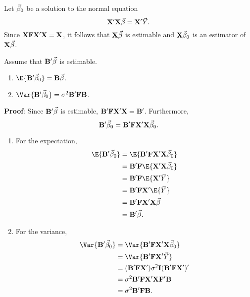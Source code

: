 \begin{Theorem}{}{}
    Let $ \vec{\beta}_0 $ be a solution to the normal equation
    \[ \mathbf{X}'\mathbf{X}\vec{\beta}=\mathbf{X}'\vec{Y}. \]
    Since $ \mathbf{X}\mathbf{F}\mathbf{X}'\mathbf{X}=\mathbf{X} $,
    it follows that $ \mathbf{X}\vec{\beta} $ is estimable and
    $ \mathbf{X}\vec{\beta}_0 $ is an estimator of $ \mathbf{X}\vec{\beta} $.

    Assume that $ \mathbf{B}'\vec{\beta} $ is estimable.
    \begin{enumerate}[(1)]
        \item $ \E{\Matrix{B}'\Vector{\beta}_0}=\Matrix{B}\Vector{\beta} $.
        \item $ \Var{\Matrix{B}'\Vector{\beta}_0}=\sigma^2 \Matrix{B}'\Matrix{F}\Matrix{B} $.
    \end{enumerate}
    \tcblower{}
    \textbf{Proof}:
    Since $ \mathbf{B}'\vec{\beta} $ is estimable, $ \mathbf{B}'\mathbf{F}\mathbf{X}'\mathbf{X}=\mathbf{B}' $.
    Furthermore,
    \[ \mathbf{B}'\vec{\beta}_0=\mathbf{B}'\mathbf{F}\mathbf{X}'\mathbf{X}\vec{\beta}_0. \]
    \begin{enumerate}[(1)]
        \item For the expectation,
              \begin{align*}
                  \E{\Matrix{B}'\Vector{\beta}_0}
                   & =\E{\Matrix{B}'\Matrix{F}\Matrix{X}'\Matrix{X}\Vector{\beta}_0} \\
                   & =\Matrix{B}'\Matrix{F}\E{\Matrix{X}'\Matrix{X}\Vector{\beta}_0} \\
                   & =\Matrix{B}'\Matrix{F}\E{\Matrix{X}'\Vector{Y}}                 \\
                   & =\Matrix{B}'\Matrix{F}\Matrix{X}'\E{\Vector{Y}}                 \\
                   & =\Matrix{B}'\Matrix{F}\Matrix{X}'\Matrix{X}\Vector{\beta}       \\
                   & =\Matrix{B}'\Vector{\beta}.
              \end{align*}
        \item For the variance,
              \begin{align*}
                  \Var{\Matrix{B}'\Vector{\beta}_0}
                   & =\Var{\Matrix{B}'\Matrix{F}\Matrix{X}'\Matrix{X}\Vector{\beta}_0}                         \\
                   & =\Var{\Matrix{B}'\Matrix{F}\Matrix{X}'\Vector{Y}}                                         \\
                   & =(\Matrix{B}'\Matrix{F}\Matrix{X}')\sigma^2 \Matrix{I}(\Matrix{B}'\Matrix{F}\Matrix{X}')' \\
                   & =\sigma^2 \Matrix{B}'\Matrix{F}\Matrix{X}'\Matrix{X}\Matrix{F}'\Matrix{B}                 \\
                   & =\sigma^2 \Matrix{B}'\Matrix{F}\Matrix{B}.
              \end{align*}
    \end{enumerate}
\end{Theorem}

